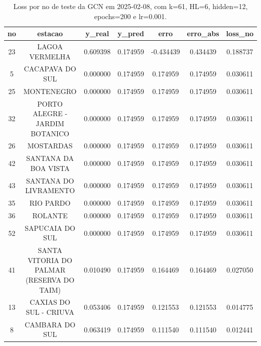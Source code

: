 \begin{table}[h]
\centering
\caption{Loss por no de teste da GCN em 2025-02-08, com k=61, HL=6, hidden=12, epochs=200 e lr=0.001.}
\label{tab:gcn_loss_k61_hl6_h12_e200_d20250208}
\begin{tabular}{ccccccc}
\toprule
no & estacao & y\_real & y\_pred & erro & erro\_abs & loss\_no \\
\midrule
23 & LAGOA VERMELHA & 0.609398 & 0.174959 & -0.434439 & 0.434439 & 0.188737 \\
5 & CACAPAVA DO SUL & 0.000000 & 0.174959 & 0.174959 & 0.174959 & 0.030611 \\
25 & MONTENEGRO & 0.000000 & 0.174959 & 0.174959 & 0.174959 & 0.030611 \\
32 & PORTO ALEGRE - JARDIM BOTANICO & 0.000000 & 0.174959 & 0.174959 & 0.174959 & 0.030611 \\
26 & MOSTARDAS & 0.000000 & 0.174959 & 0.174959 & 0.174959 & 0.030611 \\
42 & SANTANA DA BOA VISTA & 0.000000 & 0.174959 & 0.174959 & 0.174959 & 0.030611 \\
43 & SANTANA DO LIVRAMENTO & 0.000000 & 0.174959 & 0.174959 & 0.174959 & 0.030611 \\
35 & RIO PARDO & 0.000000 & 0.174959 & 0.174959 & 0.174959 & 0.030611 \\
36 & ROLANTE & 0.000000 & 0.174959 & 0.174959 & 0.174959 & 0.030611 \\
52 & SAPUCAIA DO SUL & 0.000000 & 0.174959 & 0.174959 & 0.174959 & 0.030611 \\
41 & SANTA VITORIA DO PALMAR (RESERVA DO TAIM) & 0.010490 & 0.174959 & 0.164469 & 0.164469 & 0.027050 \\
13 & CAXIAS DO SUL - CRIUVA & 0.053406 & 0.174959 & 0.121553 & 0.121553 & 0.014775 \\
8 & CAMBARA DO SUL & 0.063419 & 0.174959 & 0.111540 & 0.111540 & 0.012441 \\
\bottomrule
\end{tabular}
\end{table}
